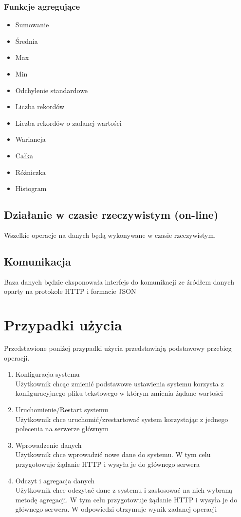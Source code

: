\documentclass[paper=a4, fontsize=11pt]{scrartcl} %
\numberwithin{equation}{section} %
\numberwithin{figure}{section} %
\numberwithin{table}{section} %
\begin{document}
        \subsubsection{Funkcje agregujące}
        \begin{itemize}
            \item Sumowanie
            \item Średnia
            \item Max
            \item Min
            \item Odchylenie standardowe
            \item Liczba rekordów
            \item Liczba rekordów o zadanej wartości
            \item Wariancja
            \item Całka
            \item Różniczka
            \item Histogram
        \end{itemize}
    \subsection{Działanie w czasie rzeczywistym (on-line)}
    Wszelkie operacje na danych będą wykonywane w czasie rzeczywistym.
    \subsection{Komunikacja}
    Baza danych będzie eksponowała interfejs do komunikacji ze źródłem danych oparty na protokole HTTP i formacie JSON

\section{Przypadki użycia}
    Przedstawione poniżej przypadki użycia przedstawiają podstawowy przebieg operacji.
    \begin{enumerate}
        \item Konfiguracja systemu
        \\Użytkownik chcąc zmienić podstawowe ustawienia systemu korzysta z konfiguracyjnego pliku tekstowego w którym
        zmienia żądane wartości
        \item Uruchomienie/Restart systemu
        \\Użytkownik chce uruchomić/zrestartować system korzystając z jednego polecenia na serwerze głównym
        \item Wprowadzenie danych
        \\Użytkownik chce wprowadzić nowe dane do systemu. W tym celu przygotowuje żądanie HTTP i wysyła je do
        głównego serwera
        \item Odczyt i agregacja danych
        \\Użytkownik chce odczytać dane z systemu i zastosować na nich wybraną metodę agregacji. W tym celu przygotowuje
        żądanie HTTP i wysyła je do głównego serwera. W odpowiedzi otrzymuje wynik zadanej operacji

    \end{enumerate}
\end{document}
